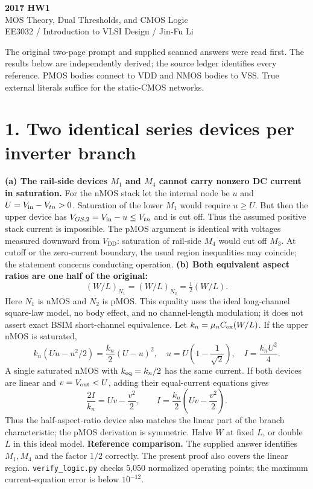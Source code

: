 \documentclass[11pt,a4paper]{article}
\newcommand{\VDD}{V_{\mathrm{DD}}}
\begin{document}
\begin{center}{\LARGE\bfseries 2017 HW1}\\[4pt]{\large MOS Theory, Dual Thresholds, and CMOS Logic}\\[4pt]{\small EE3032 / Introduction to VLSI Design / Jin-Fu Li}\end{center}
The original two-page prompt and supplied scanned answers were read first. The results below are independently derived; the source ledger identifies every reference. PMOS bodies connect to VDD and NMOS bodies to VSS. True external literals suffice for the static-CMOS networks.
\section*{1. Two identical series devices per inverter branch}
\textbf{(a) The rail-side devices $M_1$ and $M_4$ cannot carry nonzero DC current in saturation.}
For the nMOS stack let the internal node be $u$ and $U=V_{\rm in}-V_{tn}>0$.
Saturation of the lower $M_1$ would require $u\ge U$. But then the upper device has
$V_{GS,2}=V_{\rm in}-u\le V_{tn}$ and is cut off. Thus the assumed positive stack current is impossible. The pMOS argument is identical with voltages measured downward from $\VDD$: saturation of rail-side $M_4$ would cut off $M_3$.
At cutoff or the zero-current boundary, the usual region inequalities may coincide; the statement concerns conducting operation.
\textbf{(b) Both equivalent aspect ratios are one half of the original:}
\[
 \boxed{(W/L)_{N_1}=(W/L)_{N_2}=\tfrac 12(W/L).}
\]
Here $N_1$ is nMOS and $N_2$ is pMOS. This equality uses the ideal long-channel square-law model, no body effect, and no channel-length modulation; it does not assert exact BSIM short-channel equivalence.
Let $k_n=\mu_n C_{\rm ox}(W/L)$. If the upper nMOS is saturated,
\[
 k_n(Uu-u^2/2)=\frac{k_n}{2}(U-u)^2,
 \quad u=U\left(1-\frac 1{\sqrt 2}\right),
 \quad I=\frac{k_nU^2}{4}.
\]
A single saturated nMOS with $k_{\rm eq}=k_n/2$ has the same current. If both devices are linear and $v=V_{\rm out}<U$, adding their equal-current equations gives
\[
 \frac{2I}{k_n}=Uv-\frac{v^2}{2},\qquad
 I=\frac{k_n}{2}\left(Uv-\frac{v^2}{2}\right).
\]
Thus the half-aspect-ratio device also matches the linear part of the branch characteristic; the pMOS derivation is symmetric. Halve $W$ at fixed $L$, or double $L$ in this ideal model.
\textbf{Reference comparison.} The supplied answer identifies $M_1,M_4$ and the factor $1/2$ correctly. The present proof also covers the linear region. \texttt{verify\_logic.py} checks 5,050 normalized operating points; the maximum current-equation error is below $10^{-12}$.
\end{document}
